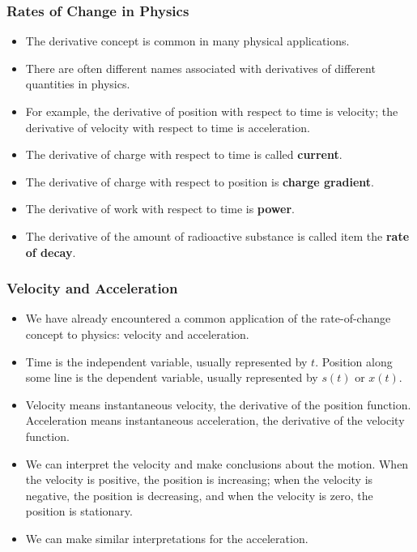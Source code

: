 \documentclass[serif,ignorenonframetext]{beamer}
\begin{document}
\begin{frame}
  \frametitle{Rates of Change in Physics}
  \begin{itemize}[<+->]
  \item The derivative concept is common in many physical applications.
  \item There are often different names associated with derivatives of
    different quantities in physics.
  \item For example, the derivative of position with respect to time
    is velocity; the derivative of velocity with respect to time
    is acceleration.
  \item The derivative of charge with respect to time is 
    called \textbf{current}.
  \item The derivative of charge with respect to position is \textbf{charge
    gradient}.
  \item The derivative of work with respect to time is \textbf{power}.
  \item The derivative of the amount of radioactive substance is called
    item the \textbf{rate of decay}.
  \end{itemize}
\end{frame}

\begin{frame}
  \frametitle{Velocity and Acceleration}
  \begin{itemize}[<+->]
  \item We have already encountered a common application of the rate-of-change
    concept to physics: velocity and acceleration.
  \item Time is the independent variable, usually represented by $t$.
    Position along some line is the dependent variable, usually represented
    by $s(t)$ or $x(t)$.
  \item Velocity means instantaneous velocity, the derivative of the position
    function.  Acceleration means instantaneous acceleration, the derivative
    of the velocity function.
  \item We can interpret the velocity and make conclusions
    about the motion.  When the velocity is positive, the position is
    increasing; when the velocity is negative, the position is decreasing,
    and when the velocity is zero, the position is stationary.
  \item We can make similar interpretations for the acceleration.
  \end{itemize}
\end{frame}
\end{document}
